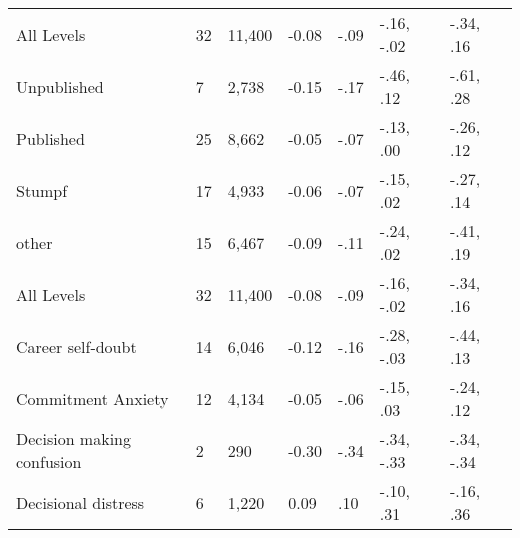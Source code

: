 \begin{table}[ht]
\begin{tabular}{lllllll}
  All Levels & 32 & 11,400 & -0.08 & -.09 & -.16, -.02 & -.34, .16 \\ 
  Unpublished & 7 &  2,738 & -0.15 & -.17 & -.46, .12 & -.61, .28 \\ 
  Published & 25 &  8,662 & -0.05 & -.07 & -.13, .00 & -.26, .12 \\ 
  Stumpf & 17 &  4,933 & -0.06 & -.07 & -.15, .02 & -.27, .14 \\ 
  other & 15 &  6,467 & -0.09 & -.11 & -.24, .02 & -.41, .19 \\ 
  All Levels & 32 & 11,400 & -0.08 & -.09 & -.16, -.02 & -.34, .16 \\ 
  Career self-doubt & 14 &  6,046 & -0.12 & -.16 & -.28, -.03 & -.44, .13 \\ 
  Commitment Anxiety & 12 &  4,134 & -0.05 & -.06 & -.15, .03 & -.24, .12 \\ 
  Decision making confusion & 2 &    290 & -0.30 & -.34 & -.34, -.33 & -.34, -.34 \\ 
  Decisional distress & 6 &  1,220 & 0.09 & .10 & -.10, .31 & -.16, .36 \\ 
   \hline
\end{tabular}
\end{table}
